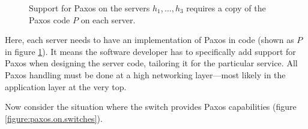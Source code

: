 \begin{figure}[H]
  \centering
  \caption{Support for Paxos on the servers $h_1, \dots, h_3$ requires a
    copy of the Paxos code $P$ on each server.}
  \label{figure:paxos.on.servers}
\end{figure}

Here, each server needs to have an implementation of Paxos in code (shown as
$P$ in figure \ref{figure:paxos.on.servers}).  It means the software
developer has to specifically add support for Paxos when designing the
server code, tailoring it for the particular service.  All Paxos handling
must be done at a high networking layer---most
likely in the application layer at the very top.

Now consider the situation where the switch provides Paxos
capabilities (figure \ref{figure:paxos.on.switches}).

